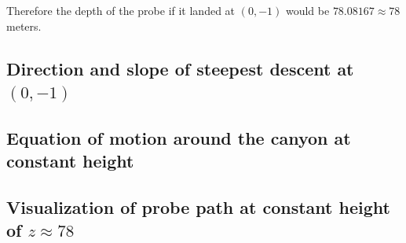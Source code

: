 \documentclass{article}
\begin{document}
Therefore the depth of the probe if it landed at $(0, -1)$ would be $78.08167 \approx 78$ meters.

\subsection{Direction and slope of steepest descent at $(0, -1)$}

\subsection{Equation of motion around the canyon at constant height}

\subsection{Visualization of probe path at constant height of $z \approx 78$}

% 
% 
\end{document}
